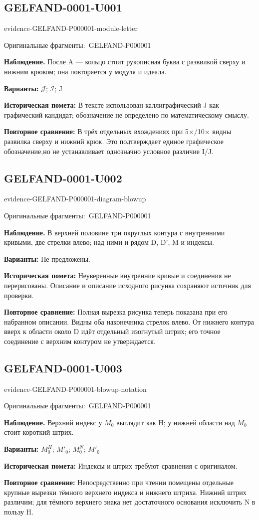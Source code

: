 \documentclass[11pt]{article}
\newcommand{\EvidenceBlock}[4]{%
 \par\smallskip\noindent\begin{minipage}{\linewidth}
 \begin{minipage}[t]{.47\linewidth}\vspace{0pt}\centering
 \csname evidence-#1-#2\endcsname\par
 {\scriptsize\SourceCropCaption\ #1}\par
 \end{minipage}\hfill
 \begin{minipage}[t]{.49\linewidth}\vspace{0pt}\raggedright
 {\small\color{orange!65!black}\textbf{#4} #3}\par
 \end{minipage}
 \end{minipage}\par\smallskip}
\newcommand{\SourceCropCaption}{Оригинальные фрагменты:}\newcommand{\ReadingCaption}{Сомнительное чтение.}\newcommand{\IncompleteCaption}{Неразобранный фрагмент.}\newcommand{\DiagramCaption}{Рисунок и набранное описание.}
\begin{document}
\subsection*{GELFAND-0001-U001}
\EvidenceBlock{GELFAND-P000001}{module-letter}{После A — кольцо стоит рукописная буква с развилкой сверху и нижним крюком; она повторяется у модуля и идеала.}{Наблюдение.}
\par\smallskip\noindent\textbf{Варианты: } \(\mathcal{J}\); \(\mathcal{I}\); J\par
\par\smallskip\noindent\textbf{Историческая помета: } В тексте использован каллиграфический J как графический кандидат; обозначение не определено по математическому смыслу.\par
\par\smallskip\noindent\textbf{Повторное сравнение: } В трёх отдельных вхождениях при 5×/10× видны развилка сверху и нижний крюк. Это подтверждает единое графическое обозначение,но не устанавливает однозначно условное различие I/J.\par
\subsection*{GELFAND-0001-U002}
\EvidenceBlock{GELFAND-P000001}{diagram-blowup}{В верхней половине три округлых контура с внутренними кривыми, две стрелки влево; над ними и рядом D, D', M и индексы.}{Наблюдение.}
\par\smallskip\noindent\textbf{Варианты: } Не предложены.\par
\par\smallskip\noindent\textbf{Историческая помета: } Неуверенные внутренние кривые и соединения не перерисованы. Описание и описание исходного рисунка сохраняют источник для проверки.\par
\par\smallskip\noindent\textbf{Повторное сравнение: } Полная вырезка рисунка теперь показана при его набранном описании. Видны оба наконечника стрелок влево. От нижнего контура вверх к области около D идёт отдельный изогнутый штрих; его точное соединение с верхним контуром не утверждается.\par
\subsection*{GELFAND-0001-U003}
\EvidenceBlock{GELFAND-P000001}{blowup-notation}{Верхний индекс у \(M_0\) выглядит как H; у нижней области над \(M_0\) стоит короткий штрих.}{Наблюдение.}
\par\smallskip\noindent\textbf{Варианты: } \(M_0^H\); \(M'_0\); \(M_0^N\); \(M'_0\)\par
\par\smallskip\noindent\textbf{Историческая помета: } Индексы и штрих требуют сравнения с оригиналом.\par
\par\smallskip\noindent\textbf{Повторное сравнение: } Непосредственно при чтении помещены отдельные крупные вырезки тёмного верхнего индекса и нижнего штриха. Нижний штрих различим; для тёмного верхнего знака нет достаточного основания исключить N в пользу H.\par
\end{document}
